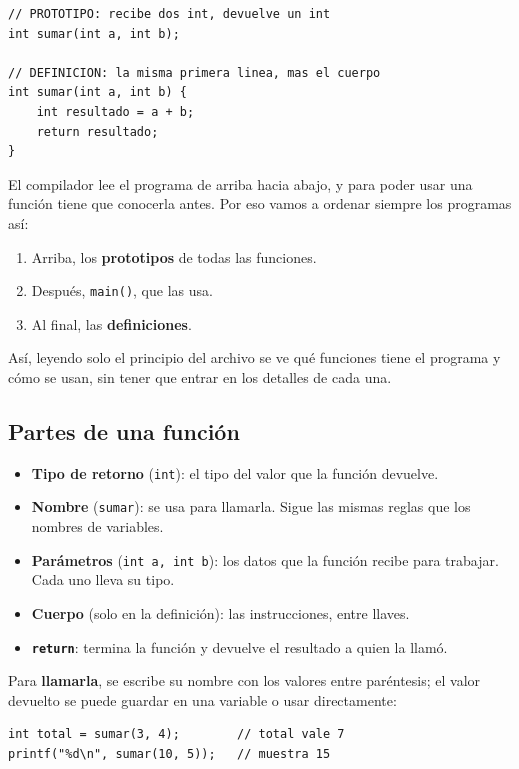 \begin{lstlisting}[style=estilo-c]
// PROTOTIPO: recibe dos int, devuelve un int
int sumar(int a, int b);

// DEFINICION: la misma primera linea, mas el cuerpo
int sumar(int a, int b) {
    int resultado = a + b;
    return resultado;
}
\end{lstlisting}

El compilador lee el programa de arriba hacia abajo, y para poder usar una función tiene que conocerla antes. Por eso vamos a ordenar siempre los programas así:

\begin{enumerate}
  \item Arriba, los \textbf{prototipos} de todas las funciones.
  \item Después, \texttt{main()}, que las usa.
  \item Al final, las \textbf{definiciones}.
\end{enumerate}

Así, leyendo solo el principio del archivo se ve qué funciones tiene el programa y cómo se usan, sin tener que entrar en los detalles de cada una.

\subsection{Partes de una función}

\begin{itemize}
  \item \textbf{Tipo de retorno} (\texttt{int}): el tipo del valor que la función devuelve.
  \item \textbf{Nombre} (\texttt{sumar}): se usa para llamarla. Sigue las mismas reglas que los nombres de variables.
  \item \textbf{Parámetros} (\texttt{int a, int b}): los datos que la función recibe para trabajar. Cada uno lleva su tipo.
  \item \textbf{Cuerpo} (solo en la definición): las instrucciones, entre llaves.
  \item \textbf{\texttt{return}}: termina la función y devuelve el resultado a quien la llamó.
\end{itemize}

Para \textbf{llamarla}, se escribe su nombre con los valores entre paréntesis; el valor devuelto se puede guardar en una variable o usar directamente:

\begin{lstlisting}[style=estilo-c]
int total = sumar(3, 4);        // total vale 7
printf("%d\n", sumar(10, 5));   // muestra 15
\end{lstlisting}


